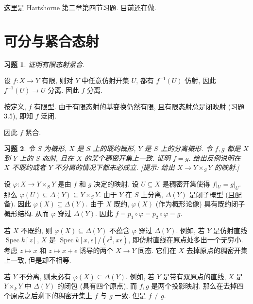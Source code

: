 \documentclass{article}
\theoremstyle{exercise}
\newtheorem{exercise}{习题}[section]
\theoremstyle{plain}
\theoremstyle{remark}
\newenvironment{proofc}{\proof}{\endproof}
\def\Spec{\operatorname{Spec}}
\begin{document}
这里是 Hartshorne 第二章第四节习题. 目前还在做.

\setcounter{section}{3}

\section{可分与紧合态射}

\begin{exercise}
  证明有限态射紧合.
\end{exercise}

\begin{proofc}
  设 $f \colon X \to Y$ 有限, 则对 $Y$ 中任意仿射开集 $U$,
  都有 $f^{-1}(U)$ 仿射, 因此 $f^{-1}(U) \to U$ 分离.
  因此 $f$ 分离.

  按定义, $f$ 有限型.
  由于有限态射的基变换仍然有限, 且有限态射总是闭映射 (习题 3.5),
  即知 $f$ 泛闭.

  因此 $f$ 紧合.
\end{proofc}

\begin{exercise}
  令 $S$ 为概形, $X$ 是 $S$ 上的既约概形, $Y$ 是 $S$ 上的分离概形.
  令 $f, g$ 都是 $X$ 到 $Y$ 上的 $S$-态射, 且在 $X$ 的某个稠密开集上一致.
  证明 $f = g$.
  给出反例说明在 $X$ 不既约或者 $Y$ 不分离的情况下都未必成立.
  [\emph{提示: 给出 $X \to Y \times_S Y$ 的映射.}]
\end{exercise}

\begin{proofc}
  设 $\varphi \colon X \to Y \times_S Y$ 是由 $f$ 和 $g$ 决定的映射.
  设 $U \subseteq X$ 是稠密开集使得 $f|_U = g|_U$.
  那么 $\varphi(U) \subseteq \Delta(Y) \subseteq Y \times_S Y$.
  由于 $Y$ 在 $S$ 上分离, $\Delta(Y)$ 是闭子概型 (且配备).
  因此 $\varphi(X) \subseteq \Delta(Y)$.
  由于 $X$ 既约, $\varphi(X)$ (作为概形论像) 具有既约闭子概形结构.
  从而 $\varphi$ 穿过 $\Delta(Y)$.
  因此 $f = p_1 \circ \varphi = p_2 \circ \varphi = g$.

  若 $X$ 不既约, 则 $\varphi(X) \subseteq \Delta(Y)$ 不蕴含 $\varphi$ 穿过 $\Delta(Y)$.
  例如, 若 $Y$ 是仿射直线 $\Spec k[z]$, $X$ 是 $\Spec k[x, \epsilon] / (\epsilon^2, x\epsilon)$, 即仿射直线在原点处多出一个无穷小.
  考虑 $z \mapsto x$ 和 $z \mapsto x + \epsilon$ 诱导的两个 $X \to Y$ 同态.
  它们在 $X$ 去掉原点的稠密开集上一致, 但是却不相等.

  若 $Y$ 不分离, 则未必有 $\varphi(X) \subseteq \Delta(Y)$.
  例如, 若 $Y$ 是带有双原点的直线, $X$ 是 $Y \times_k Y$ 中 $\Delta(Y)$ 的闭包 (具有四个原点),
  而 $f, g$ 是两个投影映射.
  那么在去掉四个原点之后剩下的稠密开集上 $f$ 与 $g$ 一致. 但是 $f \neq g$.
\end{proofc}
\end{document}
